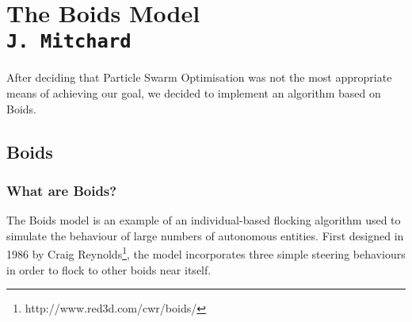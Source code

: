 \pagestyle{empty}

\section{The Boids Model\\{\small\tt J.~Mitchard}}
After deciding that Particle Swarm Optimisation was not the most appropriate means of achieving our goal, we decided to implement an algorithm based on Boids.

\subsection{Boids}
\label{boids_document}
\subsubsection{What are Boids?}
The Boids model is an example of an individual-based flocking algorithm used to simulate the behaviour of large numbers of autonomous entities. First designed in 1986 by Craig Reynolds\footnote{http://www.red3d.com/cwr/boids/}, the model incorporates three simple steering behaviours in order to flock to other boids near itself.

